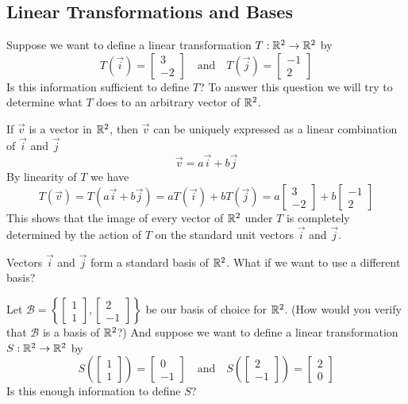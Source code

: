 \documentclass{ximera}
\begin{document}
\subsection*{Linear Transformations and Bases}

\begin{exploration}\label{init:tij}  Suppose we want to define a linear transformation $T:\mathbb{R}^2\rightarrow \mathbb{R}^2$ by $$T(\vec{i})=\begin{bmatrix}3\\-2\end{bmatrix}\quad\text{and}\quad T(\vec{j})=\begin{bmatrix}-1\\2\end{bmatrix}$$  
Is this information sufficient to define $T$?  
To answer this question we will try to determine what $T$ does to an arbitrary vector of $\mathbb{R}^2$.  

If $\vec{v}$ is a vector in $\mathbb{R}^2$, then $\vec{v}$ can be uniquely expressed as a linear combination of $\vec{i}$ and $\vec{j}$
$$\vec{v}=a\vec{i}+b\vec{j}$$  By linearity of $T$ we have $$T(\vec{v})=T(a\vec{i}+b\vec{j})=aT(\vec{i})+bT(\vec{j})=a\begin{bmatrix}3\\-2\end{bmatrix}+b\begin{bmatrix}-1\\2\end{bmatrix}$$
This shows that the image of every vector of $\mathbb{R}^2$ under $T$ is completely determined by the action of $T$ on the standard unit vectors $\vec{i}$ and $\vec{j}$.  

Vectors $\vec{i}$ and $\vec{j}$ form a standard basis of $\mathbb{R}^2$.  What if we want to use a different basis?  

Let $\mathcal{B}=\left\{\begin{bmatrix}1\\1\end{bmatrix},\begin{bmatrix}2\\-1\end{bmatrix}\right\}$ be our basis of choice for $\mathbb{R}^2$. (How would you verify that $\mathcal{B}$ is a basis of $\mathbb{R}^2$?) And suppose we want to define a linear transformation $S:\mathbb{R}^2\rightarrow \mathbb{R}^2$ by $$S\left(\begin{bmatrix}1\\1\end{bmatrix}\right)=\begin{bmatrix}0\\-1\end{bmatrix}\quad\text{and}\quad S\left(\begin{bmatrix}2\\-1\end{bmatrix}\right)=\begin{bmatrix}2\\0\end{bmatrix}$$
Is this enough information to define $S$?


\end{exploration}
\end{document}
